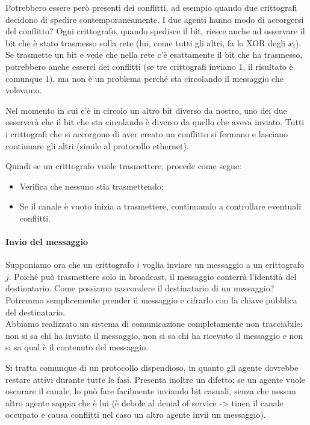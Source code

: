 Potrebbero essere però presenti dei conflitti, ad esempio quando due crittografi decidono di spedire contemporaneamente. I due agenti hanno modo di accorgersi del conflitto? Ogni crittografo, quando spedisce il bit, riesce anche ad osservare il bit che è stato trasmesso sulla rete (lui, come tutti gli altri, fa lo XOR degli $x_i$). Se trasmette un bit e vede che nella rete c'è esattamente il bit che ha trasmesso, potrebbero anche esserci dei conflitti (se tre crittografi inviano $1$, il risultato è comunque $1$), ma non è un problema perché sta circolando il messaggio che volevamo.

Nel momento in cui c'è in circolo un altro bit diverso da nostro, uno dei due osserverà che il bit che sta circolando è diverso da quello che aveva inviato. Tutti i crittografi che si accorgono di aver creato un conflitto si fermano e lasciano continuare gli altri (simile al protocollo ethernet). 

Quindi se un crittografo vuole trasmettere, procede come segue:
\begin{itemize}
    \item Verifica che nessuno stia trasmettendo;
    \item Se il canale è vuoto inizia a trasmettere, continuando a controllare eventuali conflitti.
\end{itemize}

\paragraph{Invio del messaggio} Supponiamo ora che un crittografo $i$ voglia inviare un messaggio a un crittografo $j$. Poiché può trasmettere solo in broadcast, il messaggio conterrà l'identità del destinatario. Come possiamo nascondere il destinatario di un messaggio? Potremmo semplicemente prender il messaggio e cifrarlo con la chiave pubblica del destinatario. 
\\

\noindent Abbiamo realizzato un sistema di comunicazione completamente non tracciabile: non si sa chi ha inviato il messaggio, non si sa chi ha ricevuto il messaggio e non si sa qual è il contenuto del messaggio.

Si tratta comunque di un protocollo dispendioso, in quanto gli agente dovrebbe restare attivi durante tutte le fasi. Presenta inoltre un difetto: se un agente vuole oscurare il canale, lo può fare facilmente inviando bit casuali, senza che nessun altro agente sappia  che è lui (è debole al denial of service -> tinen il canale occupato e causa conflitti nel caso un altro agente invii un messaggio).